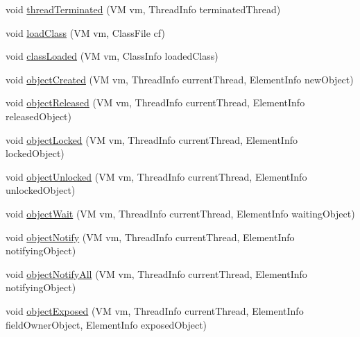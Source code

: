 \begin{DoxyCompactItemize}
void \hyperlink{classgov_1_1nasa_1_1jpf_1_1inspector_1_1server_1_1jpf_1_1_inspector_listener_a22979dd756ce41202c49722985528a08}{thread\+Terminated} (VM vm, Thread\+Info terminated\+Thread)
\item 
void \hyperlink{classgov_1_1nasa_1_1jpf_1_1inspector_1_1server_1_1jpf_1_1_inspector_listener_a760ab2dd046f4a64743bed2643a957d1}{load\+Class} (VM vm, Class\+File cf)
\item 
void \hyperlink{classgov_1_1nasa_1_1jpf_1_1inspector_1_1server_1_1jpf_1_1_inspector_listener_a3da42867462f51f4a408995d454914bd}{class\+Loaded} (VM vm, Class\+Info loaded\+Class)
\item 
void \hyperlink{classgov_1_1nasa_1_1jpf_1_1inspector_1_1server_1_1jpf_1_1_inspector_listener_ae76bbeddb57c635f59e460d451065e90}{object\+Created} (VM vm, Thread\+Info current\+Thread, Element\+Info new\+Object)
\item 
void \hyperlink{classgov_1_1nasa_1_1jpf_1_1inspector_1_1server_1_1jpf_1_1_inspector_listener_ac3bfc83df12af0bb2186b8552b417386}{object\+Released} (VM vm, Thread\+Info current\+Thread, Element\+Info released\+Object)
\item 
void \hyperlink{classgov_1_1nasa_1_1jpf_1_1inspector_1_1server_1_1jpf_1_1_inspector_listener_af0150d633ec306ca007052a276ffad42}{object\+Locked} (VM vm, Thread\+Info current\+Thread, Element\+Info locked\+Object)
\item 
void \hyperlink{classgov_1_1nasa_1_1jpf_1_1inspector_1_1server_1_1jpf_1_1_inspector_listener_aabf32ba319ba79be2688ab8561b92dee}{object\+Unlocked} (VM vm, Thread\+Info current\+Thread, Element\+Info unlocked\+Object)
\item 
void \hyperlink{classgov_1_1nasa_1_1jpf_1_1inspector_1_1server_1_1jpf_1_1_inspector_listener_a90209803c78bfb5741ed46495ebb49a7}{object\+Wait} (VM vm, Thread\+Info current\+Thread, Element\+Info waiting\+Object)
\item 
void \hyperlink{classgov_1_1nasa_1_1jpf_1_1inspector_1_1server_1_1jpf_1_1_inspector_listener_add0e69d6b39fabcb7f975ecdd29ac7f0}{object\+Notify} (VM vm, Thread\+Info current\+Thread, Element\+Info notifying\+Object)
\item 
void \hyperlink{classgov_1_1nasa_1_1jpf_1_1inspector_1_1server_1_1jpf_1_1_inspector_listener_ae77b2a8555acd3a18bf06c3ba404eea0}{object\+Notify\+All} (VM vm, Thread\+Info current\+Thread, Element\+Info notifying\+Object)
\item 
void \hyperlink{classgov_1_1nasa_1_1jpf_1_1inspector_1_1server_1_1jpf_1_1_inspector_listener_a061bbe07afbef98cca2e0c23c8a17c4d}{object\+Exposed} (VM vm, Thread\+Info current\+Thread, Element\+Info field\+Owner\+Object, Element\+Info exposed\+Object)

\end{DoxyCompactItemize}
